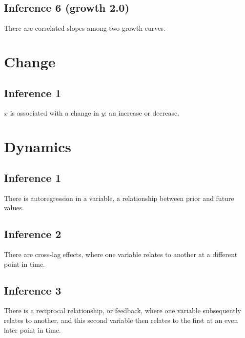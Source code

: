 \documentclass[english,,man]{apa6}
\theoremstyle{definition}
\theoremstyle{definition}
\theoremstyle{definition}
\theoremstyle{remark}
\begin{document}
\hypertarget{inference-6-growth-2.0}{%
\subsection{Inference 6 (growth 2.0)}\label{inference-6-growth-2.0}}

There are correlated slopes among two growth curves.

\hypertarget{change-1}{%
\section{Change}\label{change-1}}

\hypertarget{inference-1-7}{%
\subsection{Inference 1}\label{inference-1-7}}

\(x\) is associated with a change in \(y\): an increase or decrease.

\hypertarget{dynamics-1}{%
\section{Dynamics}\label{dynamics-1}}

\hypertarget{inference-1-8}{%
\subsection{Inference 1}\label{inference-1-8}}

There is autoregression in a variable, a relationship between prior and
future values.

\hypertarget{inference-2-5}{%
\subsection{Inference 2}\label{inference-2-5}}

There are cross-lag effects, where one variable relates to another at a
different point in time.

\hypertarget{inference-3-3}{%
\subsection{Inference 3}\label{inference-3-3}}

There is a reciprocal relationship, or feedback, where one variable
subsequently relates to another, and this second variable then relates
to the first at an even later point in time.
\end{document}
